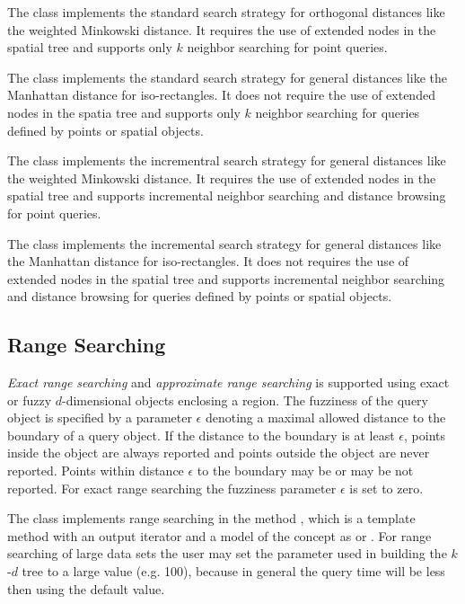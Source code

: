 The class  implements the standard
search strategy for orthogonal distances like the weighted Minkowski
distance. It requires the use of extended nodes in the spatial tree
and supports only $k$ neighbor searching for point queries.

The class  implements the standard search strategy for
general distances like the Manhattan distance for iso-rectangles.
It does not require the use of extended nodes in the spatia tree and supports
only $k$ neighbor searching for queries defined by points or spatial
objects.

The class  implements the incrementral
search strategy for general distances like the weighted Minkowski
distance. It requires the use of extended nodes in the spatial tree
and supports incremental neighbor searching and distance browsing for
point queries.

The class  implements the incremental
search strategy for general distances like the Manhattan distance for
iso-rectangles.  It does not requires the use of extended nodes in the
spatial tree and supports incremental neighbor searching and distance
browsing for queries defined by points or spatial objects.




\subsection{Range Searching}

{\em Exact range searching} and {\em approximate range searching} is
supported using exact or fuzzy $d$-dimensional objects enclosing a
region.  The fuzziness of the query object is specified by a parameter
$\epsilon$ denoting a maximal allowed distance to the boundary of a
query object.  If the distance to the boundary is at least
$\epsilon$, points inside the object are always reported and points
outside the object are never reported. Points within distance
$\epsilon$ to the boundary may be or may be not reported.  For exact
range searching the fuzziness parameter $\epsilon$ is set to zero.

The class  implements range searching in the method ,
which is a template method with an output iterator and a model of the
concept  as   
or . 
For range searching of large data sets the user may set the parameter  
used in building the $k$-$d$ tree to a large value (e.g. 100), 
because in general the query time will be less then using the default value.

